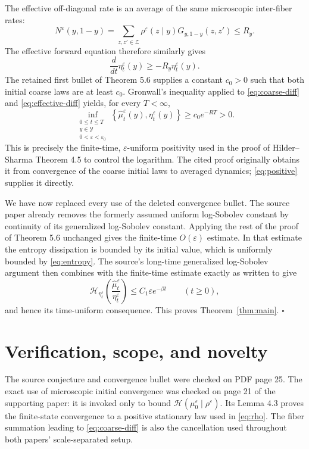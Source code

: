 \documentclass[11pt]{article}
\newcommand{\Ent}{\mathcal H}
\newcommand{\Y}{\mathcal Y}
\newcommand{\Zs}{\mathcal Z}
\begin{document}
The effective off-diagonal rate is an average of the same microscopic
inter-fiber rates:
\[
 N^\varepsilon(y,1-y)
 =\sum_{z,z'\in\Zs}
   \rho^\varepsilon(z\mid y)G_{y,1-y}(z,z')
 \leq R_y.
\]
The effective forward equation therefore similarly gives
\begin{equation}\label{eq:effective-diff}
 \frac{d}{dt}\eta_t^\varepsilon(y)
 \geq -R_y\eta_t^\varepsilon(y).
\end{equation}
The retained first bullet of Theorem 5.6 supplies a constant \(c_0>0\)
such that both initial coarse laws are at least \(c_0\). Gronwall's
inequality applied to \eqref{eq:coarse-diff} and
\eqref{eq:effective-diff} yields, for every \(T<\infty\),
\begin{equation}\label{eq:positive}
 \inf_{\substack{0\leq t\leq T\\y\in\Y\\0<\varepsilon<\varepsilon_0}}
 \left\{
 \widehat\mu_t^\varepsilon(y),\eta_t^\varepsilon(y)
 \right\}
 \geq c_0e^{-RT}>0.
\end{equation}
This is precisely the finite-time, \(\varepsilon\)-uniform positivity used
in the proof of Hilder--Sharma Theorem 4.5 to control the logarithm. The
cited proof originally obtains it from convergence of the coarse initial
laws to averaged dynamics; \eqref{eq:positive} supplies it directly.

We have now replaced every use of the deleted convergence bullet. The
source paper already removes the formerly assumed uniform log-Sobolev
constant by continuity of its generalized log-Sobolev constant. Applying
the rest of the proof of Theorem 5.6 unchanged gives the finite-time
\(O(\varepsilon)\) estimate. In that estimate the entropy dissipation is
bounded by its initial value, which is uniformly bounded by
\eqref{eq:entropy}. The source's long-time generalized log-Sobolev argument
then combines with the finite-time estimate exactly as written to give
\[
 \Ent_{\eta_t^\varepsilon}
 \left(\frac{\widehat\mu_t^\varepsilon}{\eta_t^\varepsilon}\right)
 \leq C_1\varepsilon e^{-\beta t}\qquad(t\geq0),
\]
and hence its time-uniform consequence. This proves
Theorem~\ref{thm:main}. \(\square\)

\section*{Verification, scope, and novelty}

The source conjecture and convergence bullet were checked on PDF page 25.
The exact use of microscopic initial convergence was checked on page 21 of
the supporting paper: it is invoked only to bound
\(\Ent(\mu_0^\varepsilon\mid\rho^\varepsilon)\). Its Lemma 4.3 proves the
finite-state convergence to a positive stationary law used in
\eqref{eq:rho}. The fiber summation leading to
\eqref{eq:coarse-diff} is also the cancellation used throughout both papers'
scale-separated setup.
\end{document}
